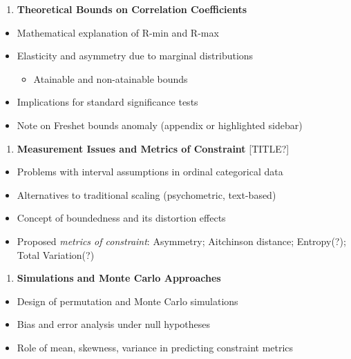 \documentclass[
  12pt,
]{article}
\providecommand{\tightlist}{%
  \setlength{\itemsep}{0pt}\setlength{\parskip}{0pt}}\usepackage{longtable,booktabs,array}
\theoremstyle{plain}
\theoremstyle{definition}
\theoremstyle{remark}
\begin{document}
\begin{enumerate}
\def\labelenumi{\arabic{enumi}.}
\setcounter{enumi}{1}
\tightlist
\item
  \textbf{Theoretical Bounds on Correlation Coefficients}
\end{enumerate}

\begin{itemize}
\tightlist
\item
  Mathematical explanation of R-min and R-max
\item
  Elasticity and asymmetry due to marginal distributions

  \begin{itemize}
  \tightlist
  \item
    Atainable and non-atainable bounds
  \end{itemize}
\item
  Implications for standard significance tests
\item
  Note on Freshet bounds anomaly (appendix or highlighted sidebar)
\end{itemize}

\begin{enumerate}
\def\labelenumi{\arabic{enumi}.}
\setcounter{enumi}{2}
\tightlist
\item
  \textbf{Measurement Issues and Metrics of Constraint} {[}TITLE?{]}
\end{enumerate}

\begin{itemize}
\tightlist
\item
  Problems with interval assumptions in ordinal categorical data
\item
  Alternatives to traditional scaling (psychometric, text-based)
\item
  Concept of boundedness and its distortion effects
\item
  Proposed \emph{metrics of constraint}: Asymmetry; Aitchinson distance;
  Entropy(?); Total Variation(?)
\end{itemize}

\begin{enumerate}
\def\labelenumi{\arabic{enumi}.}
\setcounter{enumi}{3}
\tightlist
\item
  \textbf{Simulations and Monte Carlo Approaches}
\end{enumerate}

\begin{itemize}
\tightlist
\item
  Design of permutation and Monte Carlo simulations
\item
  Bias and error analysis under null hypotheses
\item
  Role of mean, skewness, variance in predicting constraint metrics
\end{itemize}
\end{document}
